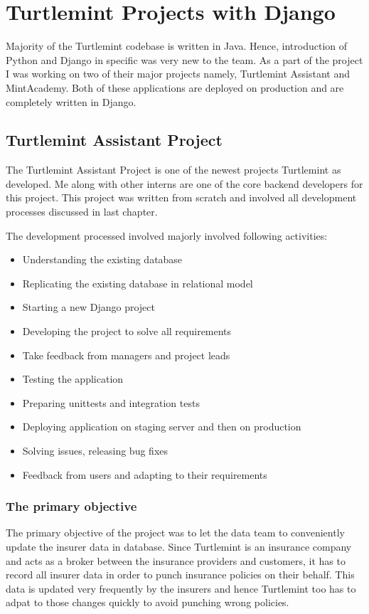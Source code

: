 \chapter{Turtlemint Projects with Django}

Majority of the Turtlemint codebase is written in Java. Hence, introduction
of Python and Django in specific was very new to the team. As a part of the
project I was working on two of their major projects namely, Turtlemint
Assistant and MintAcademy. Both of these applications are deployed on
production and are completely written in Django.

\section{Turtlemint Assistant Project}
The Turtlemint Assistant Project is one of the newest projects Turtlemint as
developed. Me along with other interns are one of the core backend developers
for this project. This project was written from scratch and involved all
development processes discussed in last chapter.

The development processed involved majorly involved following activities:

\begin{itemize}
    \item Understanding the existing database
    \item Replicating the existing database in relational model
    \item Starting a new Django project
    \item Developing the project to solve all requirements
    \item Take feedback from managers and project leads
    \item Testing the application
    \item Preparing unittests and integration tests
    \item Deploying application on staging server and then on production
    \item Solving issues, releasing bug fixes
    \item Feedback from users and adapting to their requirements
\end{itemize}

\subsection{The primary objective}
The primary objective of the project was to let the data team to conveniently
update the insurer data in database. Since Turtlemint is an insurance company
and acts as a broker between the insurance providers and customers, it has to
record all insurer data in order to punch insurance policies on their behalf.
This data is updated very frequently by the insurers and hence Turtlemint too
has to adpat to those changes quickly to avoid punching wrong policies.

